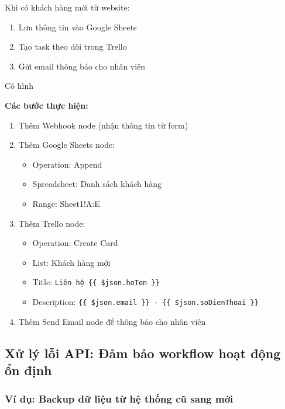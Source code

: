 Khi có khách hàng mới từ website:
\begin{enumerate}
    \item Lưu thông tin vào Google Sheets
    \item Tạo task theo dõi trong Trello
    \item Gửi email thông báo cho nhân viên
\end{enumerate}

Có hình

\textbf{Các bước thực hiện:}
\begin{enumerate}
    \item Thêm Webhook node (nhận thông tin từ form)
    \item Thêm Google Sheets node:
    \begin{itemize}
        \item Operation: Append
        \item Spreadsheet: Danh sách khách hàng
        \item Range: Sheet1!A:E
    \end{itemize}
    \item Thêm Trello node:
    \begin{itemize}
        \item Operation: Create Card
        \item List: Khách hàng mới
        \item Title: \verb|Liên hệ {{ $json.hoTen }}|
        \item Description: \verb|{{ $json.email }} - {{ $json.soDienThoai }}|
    \end{itemize}
    \item Thêm Send Email node để thông báo cho nhân viên
\end{enumerate}

\subsection{Xử lý lỗi API: Đảm bảo workflow hoạt động ổn định}

\subsubsection{Ví dụ: Backup dữ liệu từ hệ thống cũ sang mới}

